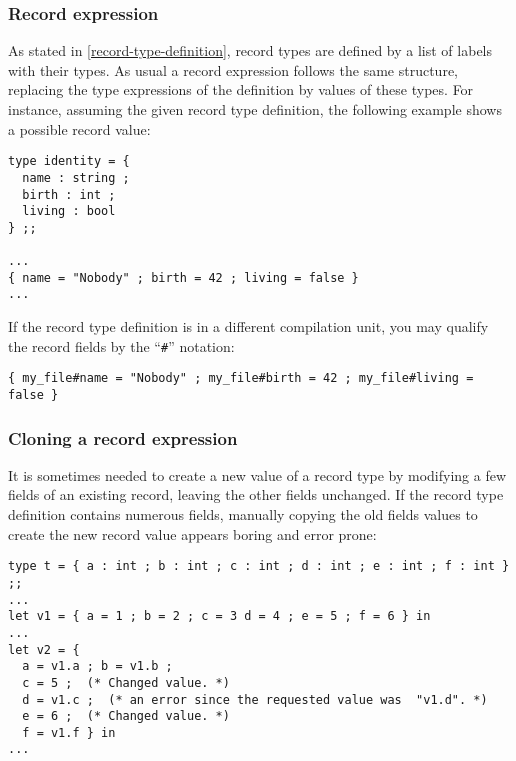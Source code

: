 \subsubsection{Record expression}
\label{record-expression}
As stated in \ref{record-type-definition},
record types are defined by a list of labels with their types. As
usual a record
expression follows the same structure, replacing the type expressions
of the definition by values of these types. For instance, assuming the
given record type definition, the following example shows a possible
record value:

{\scriptsize
\begin{lstlisting}
type identity = {
  name : string ;
  birth : int ;
  living : bool
} ;;

...
{ name = "Nobody" ; birth = 42 ; living = false }
...
\end{lstlisting}}

If the record type definition is in a different compilation unit, you
may qualify the record fields by the ``{\tt\#}'' notation:

{\scriptsize
\begin{lstlisting}
{ my_file#name = "Nobody" ; my_file#birth = 42 ; my_file#living = false }
\end{lstlisting}}



\subsubsection{Cloning a record expression}
\label{record-clone-expression}
 It is sometimes needed to create a new
value of a record type by modifying a few fields of an existing
record, leaving the other fields unchanged. If the record type
definition contains numerous fields, manually copying the old fields
values to create the new record value appears boring and error prone:

{\scriptsize
\begin{lstlisting}
type t = { a : int ; b : int ; c : int ; d : int ; e : int ; f : int } ;;
...
let v1 = { a = 1 ; b = 2 ; c = 3 d = 4 ; e = 5 ; f = 6 } in
...
let v2 = {
  a = v1.a ; b = v1.b ;
  c = 5 ;  (* Changed value. *)
  d = v1.c ;  (* an error since the requested value was  "v1.d". *)
  e = 6 ;  (* Changed value. *)
  f = v1.f } in
...
\end{lstlisting}}

